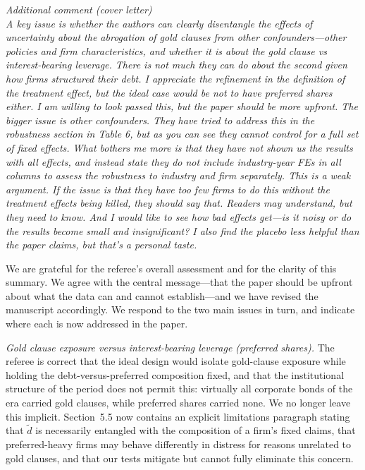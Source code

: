 \noindent \textit{\textcolor{red!60!black}{
Additional comment (cover letter)\\
A key issue is whether the authors can clearly disentangle the effects of uncertainty about the abrogation of gold clauses from other confounders---other policies and firm characteristics, and whether it is about the gold clause vs interest-bearing leverage. There is not much they can do about the second given how firms structured their debt. I appreciate the refinement in the definition of the treatment effect, but the ideal case would be not to have preferred shares either. I am willing to look passed this, but the paper should be more upfront. The bigger issue is other confounders. They have tried to address this in the robustness section in Table 6, but as you can see they cannot control for a full set of fixed effects. What bothers me more is that they have not shown us the results with all effects, and instead state they do not include industry-year FEs in all columns to assess the robustness to industry and firm separately. This is a weak argument. If the issue is that they have too few firms to do this without the treatment effects being killed, they should say that. Readers may understand, but they need to know. And I would like to see how bad effects get---is it noisy or do the results become small and insignificant? I also find the placebo less helpful than the paper claims, but that's a personal taste.
}}

\bigskip

\noindent We are grateful for the referee's overall assessment and for the clarity of this summary. We agree with the central message---that the paper should be upfront about what the data can and cannot establish---and we have revised the manuscript accordingly. We respond to the two main issues in turn, and indicate where each is now addressed in the paper.

\medskip
\noindent \textit{Gold clause exposure versus interest-bearing leverage (preferred shares).} The referee is correct that the ideal design would isolate gold-clause exposure while holding the debt-versus-preferred composition fixed, and that the institutional structure of the period does not permit this: virtually all corporate bonds of the era carried gold clauses, while preferred shares carried none. We no longer leave this implicit. Section~5.5 now contains an explicit limitations paragraph stating that $\tilde{d}$ is necessarily entangled with the composition of a firm's fixed claims, that preferred-heavy firms may behave differently in distress for reasons unrelated to gold clauses, and that our tests mitigate but cannot fully eliminate this concern.

